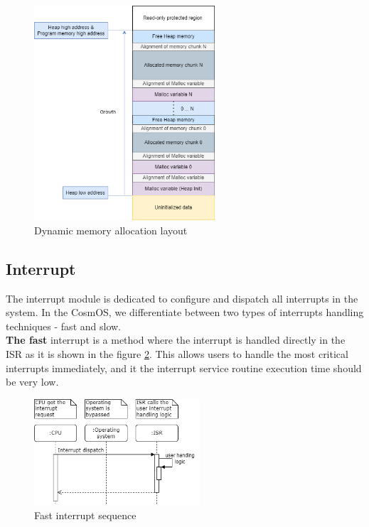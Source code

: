 \begin{figure}[H]
\begin{center}
\includegraphics[width=0.6\textwidth]{images/heap_allocations.png}
\caption{Dynamic memory allocation layout}
\label{fig:HeapAllocation}
\end{center}
\end{figure}

\subsection{Interrupt}
The interrupt module is dedicated to configure and dispatch all interrupts in the system. In the CosmOS, we differentiate between two types of interrupts handling techniques - fast
and slow. \\

\textbf{The fast} interrupt is a method where the interrupt is handled directly in the \ac{ISR} as it is shown in the figure \ref{fig:fastInterrupts}. This allows users to handle the most critical interrupts immediately, and it the interrupt service routine execution time should be very low.

\begin{figure}[H]
\begin{center}
\includegraphics[width=0.55\textwidth]{images/fast_interrupt.png}
\caption{Fast interrupt sequence}
\label{fig:fastInterrupts}
\end{center}
\end{figure}

